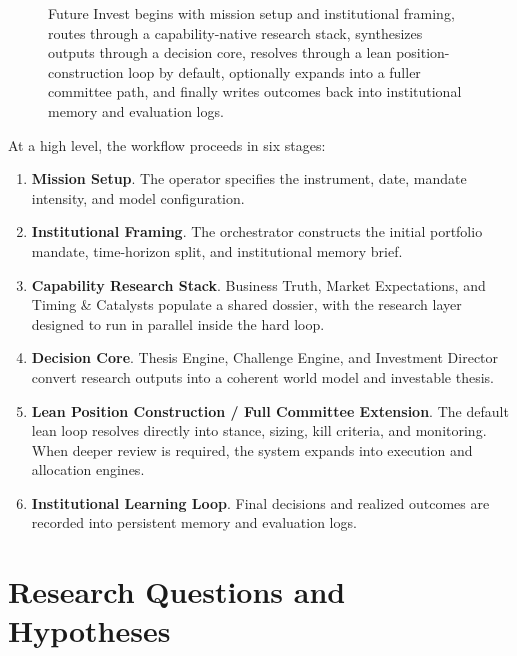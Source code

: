 \documentclass[11pt]{article}
\begin{document}
\begin{figure}[htbp]
{
}
\caption{Future Invest begins with mission setup and institutional framing, routes through a capability-native research stack, synthesizes outputs through a decision core, resolves through a lean position-construction loop by default, optionally expands into a fuller committee path, and finally writes outcomes back into institutional memory and evaluation logs.}
\label{fig:workflow}
\end{figure}

At a high level, the workflow proceeds in six stages:

\begin{enumerate}
\item \textbf{Mission Setup}. The operator specifies the instrument, date, mandate intensity, and model configuration.
\item \textbf{Institutional Framing}. The orchestrator constructs the initial portfolio mandate, time-horizon split, and institutional memory brief.
\item \textbf{Capability Research Stack}. Business Truth, Market Expectations, and Timing \& Catalysts populate a shared dossier, with the research layer designed to run in parallel inside the hard loop.
\item \textbf{Decision Core}. Thesis Engine, Challenge Engine, and Investment Director convert research outputs into a coherent world model and investable thesis.
\item \textbf{Lean Position Construction / Full Committee Extension}. The default lean loop resolves directly into stance, sizing, kill criteria, and monitoring. When deeper review is required, the system expands into execution and allocation engines.
\item \textbf{Institutional Learning Loop}. Final decisions and realized outcomes are recorded into persistent memory and evaluation logs.
\end{enumerate}

\section{Research Questions and Hypotheses}
\end{document}
